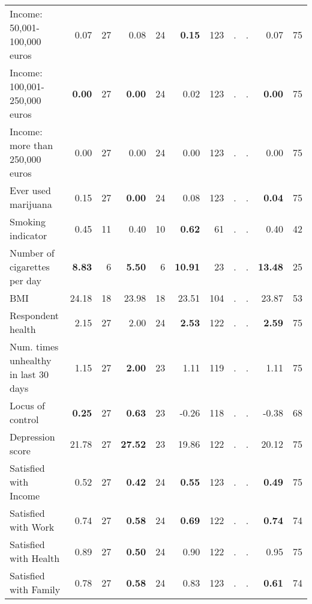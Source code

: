 \begin{tabular}{l r r r r r r r r r r}
Income: 50,001-100,000 euros &      0.07 &        27 &      0.08 &        24 & \textbf{     0.15} &       123 &         . & . &      0.07 &        75 \\
Income: 100,001-250,000 euros & \textbf{     0.00} &        27 & \textbf{     0.00} &        24 &      0.02 &       123 &         . & . & \textbf{     0.00} &        75 \\
Income: more than 250,000 euros &      0.00 &        27 &      0.00 &        24 &      0.00 &       123 &         . & . &      0.00 &        75 \\
Ever used marijuana &      0.15 &        27 & \textbf{     0.00} &        24 &      0.08 &       123 &         . & . & \textbf{     0.04} &        75 \\
Smoking indicator &      0.45 &        11 &      0.40 &        10 & \textbf{     0.62} &        61 &         . & . &      0.40 &        42 \\
Number of cigarettes per day & \textbf{     8.83} &         6 & \textbf{     5.50} &         6 & \textbf{    10.91} &        23 &         . & . & \textbf{    13.48} &        25 \\
BMI &     24.18 &        18 &     23.98 &        18 &     23.51 &       104 &         . & . &     23.87 &        53 \\
Respondent health &      2.15 &        27 &      2.00 &        24 & \textbf{     2.53} &       122 &         . & . & \textbf{     2.59} &        75 \\
Num. times unhealthy in last 30 days &      1.15 &        27 & \textbf{     2.00} &        23 &      1.11 &       119 &         . & . &      1.11 &        75 \\
Locus of control & \textbf{     0.25} &        27 & \textbf{     0.63} &        23 &     -0.26 &       118 &         . & . &     -0.38 &        68 \\
Depression score &     21.78 &        27 & \textbf{    27.52} &        23 &     19.86 &       122 &         . & . &     20.12 &        75 \\
Satisfied with Income &      0.52 &        27 & \textbf{     0.42} &        24 & \textbf{     0.55} &       123 &         . & . & \textbf{     0.49} &        75 \\
Satisfied with Work &      0.74 &        27 & \textbf{     0.58} &        24 & \textbf{     0.69} &       122 &         . & . & \textbf{     0.74} &        74 \\
Satisfied with Health &      0.89 &        27 & \textbf{     0.50} &        24 &      0.90 &       122 &         . & . &      0.95 &        75 \\
Satisfied with Family &      0.78 &        27 & \textbf{     0.58} &        24 &      0.83 &       123 &         . & . & \textbf{     0.61} &        74 \\
\bottomrule
\end{tabular}
